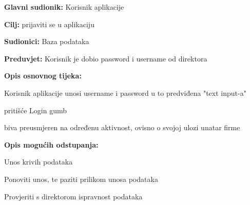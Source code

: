 	\noindent {}
	\begin{packed_item}
		
		\item \textbf{Glavni sudionik: }Korisnik aplikacije
		\item  \textbf{Cilj:} prijaviti se u aplikaciju
		\item  \textbf{Sudionici:} Baza podataka
		\item  \textbf{Preduvjet:} Korisnik je dobio password i username od direktora
		\item  \textbf{Opis osnovnog tijeka:}
		
		\item[] \begin{packed_enum}
			
			\item Korisnik aplikacije unosi username i password u to predviđena "text input-a"
			\item pritišće Login gumb
			\item biva preusmjeren na određenu aktivnost, ovisno o svojoj ulozi unatar firme
			
		\end{packed_enum}
		
		\item  \textbf{Opis mogućih odstupanja:}
		
		\item[] \begin{packed_item}
			
			\item[1.a] Unos krivih podataka
			\item[] \begin{packed_enum}
				
				\item Ponoviti unos, te paziti prilikom unosa podataka
				\item Provjeriti s direktorom ispravnost podataka
				
			\end{packed_enum}
			
			
		\end{packed_item}
	\end{packed_item}
	
